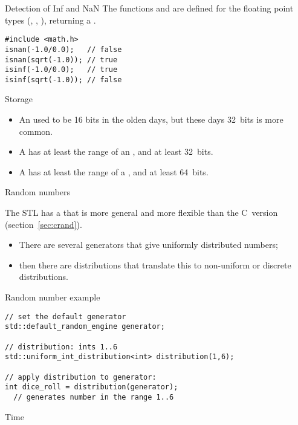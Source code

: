 \begin{block}{Detection of Inf and NaN}
  The functions  and  are
  defined for the floating point types (, , ), returning a .
\begin{lstlisting}
#include <math.h>
isnan(-1.0/0.0);   // false
isnan(sqrt(-1.0)); // true
isinf(-1.0/0.0);   // true
isinf(sqrt(-1.0)); // false
\end{lstlisting}
\end{block}

 {Storage}

\begin{itemize}
\item An  used to be 16 bits in the olden days, but these days
  32~bits is more common.
\item A  has at least the range of an
  , and at least 32~bits.
\item A  has at least the
  range of a , and at least 64~bits.
\end{itemize}

 {Random numbers}
\label{sec:stl:random}

The \ac{STL} has a
that is more general and more flexible than the C~version (section~\ref{sec:crand}).
\begin{itemize}
\item There are several generators that give uniformly distributed
  numbers;
\item then there are distributions that translate this to non-uniform
  or discrete distributions.
\end{itemize}

\begin{block}{Random number example}
  \label{sl:stl:rand16}
\begin{lstlisting}
// set the default generator
std::default_random_engine generator;

// distribution: ints 1..6
std::uniform_int_distribution<int> distribution(1,6);

// apply distribution to generator:
int dice_roll = distribution(generator);
  // generates number in the range 1..6 
\end{lstlisting}
\end{block}

 {Time}

